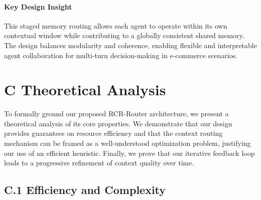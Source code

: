 \paragraph{Key Design Insight}
This staged memory routing allows each agent to operate within its own contextual window while contributing to a globally consistent shared memory. The design balances modularity and coherence, enabling flexible and interpretable agent collaboration for multi-turn decision-making in e-commerce scenarios.


\section{C \quad Theoretical Analysis} \label{app:theorem} 

To formally ground our proposed RCR-Router architecture, we present a theoretical analysis of its core properties. We demonstrate that our design provides guarantees on resource efficiency and that the context routing mechanism can be framed as a well-understood optimization problem, justifying our use of an efficient heuristic. Finally, we prove that our iterative feedback loop leads to a progressive refinement of context quality over time.


\subsection{C.1 \quad Efficiency and Complexity}

